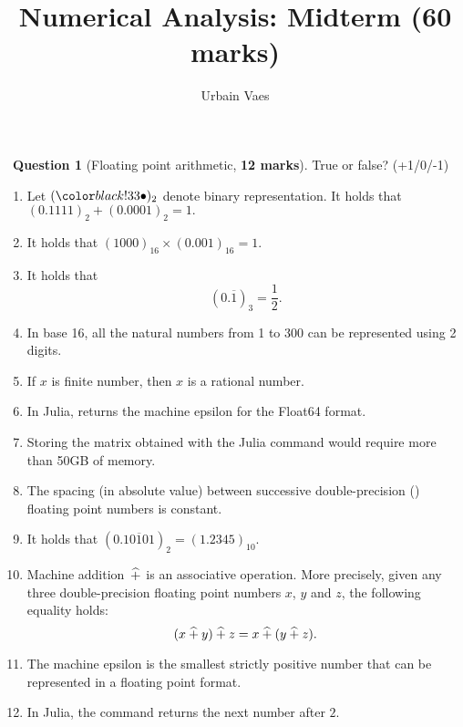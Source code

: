 \documentclass[11pt]{article}
\theoremstyle{definition}
\newtheorem{question}{{\normalfont \faGears}~Question}
\renewcommand{\mymarks}[1]{\textbf{#1 marks}}
\begin{document}
\title{Numerical Analysis: Midterm {\small (\mymarks{60})}}
\author{Urbain Vaes}
\maketitle

\begin{question}
    [Floating point arithmetic, \mymarks{12}]
    True or false? (+1/0/-1)
    \begin{enumerate}
        \item Let $(\placeholder)_2$ denote binary representation.
            It holds that
            \(
                (0.1111)_2 + (0.0001)_2 = 1.
            \)
        \item It holds that
            \(
                (1000)_{16} \times (0.001)_{16} = 1.
            \)
        \item It holds that
            \[
                (0.\overline{1})_3 = \frac{1}{2}.
            \]

        \item
            In base 16, all the natural numbers from 1 to 300 can be represented using 2 digits.

        \item
            If $x$ is finite  number,
            then $x$ is a rational number.

        \item
            In Julia,  returns the machine epsilon for the Float64 format.

        \item
            Storing the matrix obtained with the Julia command  would require more than 50GB of memory.

        \item
            The spacing (in absolute value) between successive double-precision () floating point numbers is constant.

        \item
            It holds that $(0.\overline{10101})_2 = (1.2345)_{10}$.

        \item Machine addition~$\mathbin{\widehat +}$ is an associative operation.
            More precisely, given any three double-precision floating point numbers $x$, $y$ and $z$,
            the following equality holds:
            \[
                (x \mathbin{\widehat +} y) \mathbin{\widehat +} z = x \mathbin{\widehat +} (y \mathbin{\widehat +} z).
            \]
        \item
            The machine epsilon is the smallest strictly positive number that can be represented in a floating point format.

        \item
            In Julia, the command  returns
            the next  number after $2$.
    \end{enumerate}
\end{question}
\end{document}

